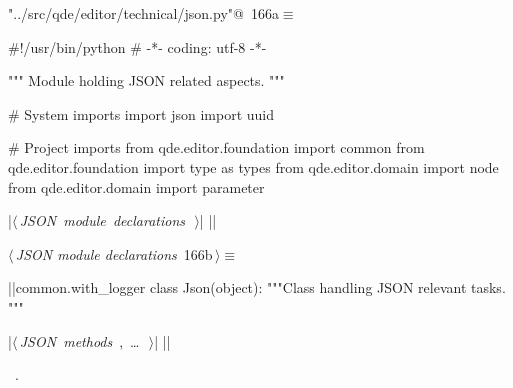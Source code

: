 \documentclass[%
    a4paper,    %
    justified,  %
    nobib,      %
    openany     %
]{tufte-book}
\begin{document}
\begin{flushleft} \small
\begin{minipage}{\linewidth}\label{scrap194}\raggedright\small
{} \verb@"../src/qde/editor/technical/json.py"@\nobreak\ {\footnotesize {166a}}$\equiv$
\vspace{-1ex}
\begin{pythoncode}
#!/usr/bin/python
# -*- coding: utf-8 -*-

""" Module holding JSON related aspects.
"""

# System imports
import json
import uuid

# Project imports
from qde.editor.foundation import common
from qde.editor.foundation import type as types
from qde.editor.domain import node
from qde.editor.domain import parameter


|\hbox{$\langle\,${\itshape JSON module declarations}\nobreak\ {\footnotesize {}}$\,\rangle$}|
|\NWsep|
\end{pythoncode}
\vspace{1.5ex}
\footnotesize
\begin{list}{}{\setlength{\itemsep}{-\parsep}\setlength{\itemindent}{-\leftmargin}}

\item{}
\end{list}
\end{minipage}\vspace{4ex}
\end{flushleft}
\begin{flushleft} \small
\begin{minipage}{\linewidth}\label{scrap195}\raggedright\small
{} $\langle\,${\itshape JSON module declarations}\nobreak\ {\footnotesize {166b}}$\,\rangle\equiv$
\vspace{-1ex}
\begin{pythoncode}
|\normalfont{}\fontfamily{}|common.with_logger
class Json(object):
    """Class handling JSON relevant tasks.
    """

    |\hbox{$\langle\,${\itshape JSON methods}\nobreak\ {\footnotesize {}, \ldots\ }$\,\rangle$}|
|\NWsep|
\end{pythoncode}
\vspace{1.5ex}
\footnotesize
\begin{list}{}{\setlength{\itemsep}{-\parsep}\setlength{\itemindent}{-\leftmargin}}
\item \NWtxtMacroRefIn\ .

\item{}
\end{list}
\end{minipage}\vspace{4ex}
\end{flushleft}
\end{document}
